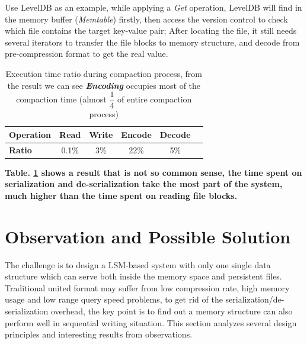 Use LevelDB\cite{LevelDBo44:online} as an example, while applying a \textit{Get} operation, LevelDB will find in the memory buffer (\textit{Memtable}) firstly, then access the version control to check which file contains the target key-value pair; After locating the file, it still needs several iterators to transfer the file blocks to memory structure, and decode from pre-compression format to get the real value. 
\begin{table}[t]
	\centering
	\begin{tabular}{|l|c|c|c|c|c|}
		\hline
		\textbf{Operation} & Read & Write & Encode & Decode  \\ \hline
		\textbf{Ratio} & 0.1\% & 3\% & 22\% & 5\%  \\ \hline
	\end{tabular}
	\caption{Execution time ratio during compaction process, from the result we can see \textbf{\textit{Encoding}} occupies most of the compaction time (almost $\dfrac{1}{4}$ of entire compaction process)}
	\label{tab:file_read_ratio}
\end{table}

\textbf{Table. \ref{tab:file_read_ratio} shows a result that is not so common sense, the time spent on serialization and de-serialization take the most part of the system, much higher than the time spent on reading file blocks.}

\section{Observation and Possible Solution}
The challenge is to design a LSM-based system with only one single data structure which can serve both inside the memory space and persistent files. Traditional united format may suffer from low compression rate, high memory usage and low range query speed problems, to get rid of the serialization/de-serialization overhead, the key point is to find out a memory structure can also perform well in sequential writing situation. This section analyzes several design principles and interesting results from observations.

